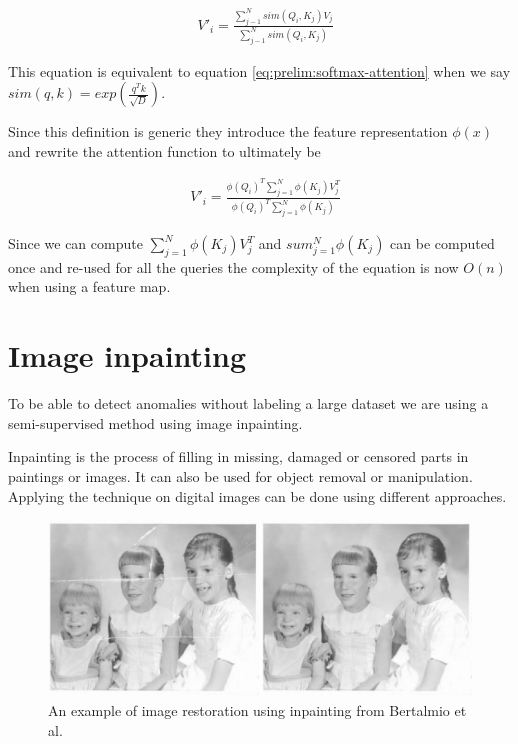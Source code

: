 \begin{align}
&V'_i =\frac{\sum_{j-1} ^{N} sim(Q_i, K_j) V_j}{\sum_{j-1} ^{N} sim(Q_i, K_j)}
\end{align}

This equation is equivalent to equation \ref{eq:prelim:softmax-attention} when we say $sim(q, k) = exp(\frac{q^Tk}{\sqrt{D}})$.

Since this definition is generic they introduce the feature representation $\phi(x)$ and rewrite the attention function to ultimately be

\begin{align}
    &V'_i = \frac{\phi(Q_i)^T\sum_{j=1}^{N} \phi(K_j)V_j^T}{\phi(Q_i)^T\sum_{j=1}^{N} \phi(K_j)}
\end{align}

Since we can compute $\sum_{j=1}^{N} \phi(K_j)V_j^T$ and $sum_{j=1}^{N} \phi(K_j)$ can be computed once and re-used for all the queries the complexity of the equation is now $O(n)$ when using a feature map.

\section{Image inpainting}
\label{sec:prelim:image-inpainting}

To be able to detect anomalies without labeling a large dataset we are using a semi-supervised method using image inpainting.

Inpainting is the process of filling in missing, damaged or censored parts in paintings or images. It can also be used for object removal or manipulation.
Applying the technique on digital images can be done using different approaches.

\begin{figure}[ht!]
\centering
\includegraphics[width=\textwidth]{imgs/inpainting-example.jpeg}
\caption{An example of image restoration using inpainting from Bertalmio et al. \cite{bertalmio_image_2000}}
\label{fig:prelim:inpainting-example}
\end{figure}

